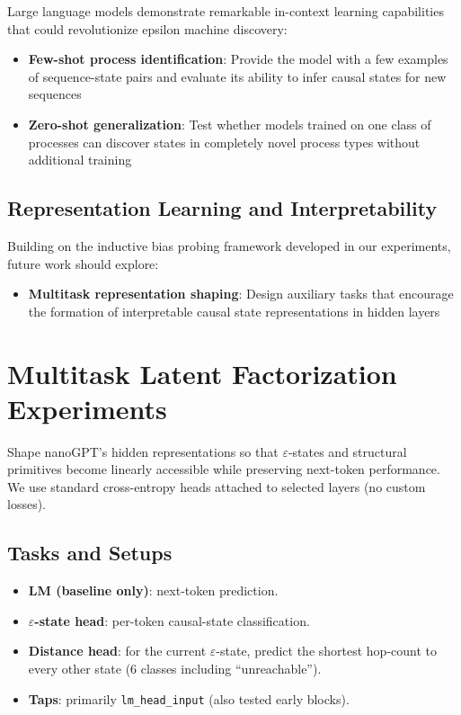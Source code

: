 \documentclass[11pt]{article}
\begin{document}
\begin{resultbox}
Large language models demonstrate remarkable in-context learning capabilities that could revolutionize epsilon machine discovery:
\begin{itemize}
    \item \textbf{Few-shot process identification}: Provide the model with a few examples of sequence-state pairs and evaluate its ability to infer causal states for new sequences
    \item \textbf{Zero-shot generalization}: Test whether models trained on one class of processes can discover states in completely novel process types without additional training
\end{itemize}
\end{resultbox}

\subsection{Representation Learning and Interpretability}

Building on the inductive bias probing framework developed in our experiments, future work should explore:

\begin{itemize}
    \item \textbf{Multitask representation shaping}: Design auxiliary tasks that encourage the formation of interpretable causal state representations in hidden layers
\end{itemize}

\section{Multitask Latent Factorization Experiments}

\begin{notebox}[Objective]
Shape nanoGPT's hidden representations so that $\varepsilon$-states and structural primitives become linearly accessible while preserving next-token performance. We use standard cross-entropy heads attached to selected layers (no custom losses).
\end{notebox}

\subsection{Tasks and Setups}
\begin{itemize}
    \item \textbf{LM (baseline only)}: next-token prediction.
    \item \textbf{$\varepsilon$-state head}: per-token causal-state classification.
    \item \textbf{Distance head}: for the current $\varepsilon$-state, predict the shortest hop-count to every other state (6 classes including ``unreachable'').
    \item \textbf{Taps}: primarily \texttt{lm\_head\_input} (also tested early blocks).
\end{itemize}
\end{document}
